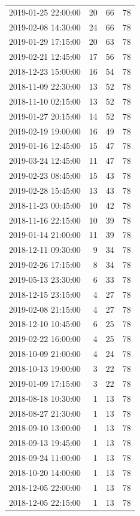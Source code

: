 \begin{tabular}{lrrr}
2019-01-25 22:00:00 & 20 & 66 & 78 \\
2019-02-08 14:30:00 & 24 & 66 & 78 \\
2019-01-29 17:15:00 & 20 & 63 & 78 \\
2019-02-21 12:45:00 & 17 & 56 & 78 \\
2018-12-23 15:00:00 & 16 & 54 & 78 \\
2018-11-09 22:30:00 & 13 & 52 & 78 \\
2018-11-10 02:15:00 & 13 & 52 & 78 \\
2019-01-27 20:15:00 & 14 & 52 & 78 \\
2019-02-19 19:00:00 & 16 & 49 & 78 \\
2019-01-16 12:45:00 & 15 & 47 & 78 \\
2019-03-24 12:45:00 & 11 & 47 & 78 \\
2019-02-23 08:45:00 & 15 & 43 & 78 \\
2019-02-28 15:45:00 & 13 & 43 & 78 \\
2018-11-23 00:45:00 & 10 & 42 & 78 \\
2018-11-16 22:15:00 & 10 & 39 & 78 \\
2019-01-14 21:00:00 & 11 & 39 & 78 \\
2018-12-11 09:30:00 & 9 & 34 & 78 \\
2019-02-26 17:15:00 & 8 & 34 & 78 \\
2019-05-13 23:30:00 & 6 & 33 & 78 \\
2018-12-15 23:15:00 & 4 & 27 & 78 \\
2019-02-08 21:15:00 & 4 & 27 & 78 \\
2018-12-10 10:45:00 & 6 & 25 & 78 \\
2019-02-22 16:00:00 & 4 & 25 & 78 \\
2018-10-09 21:00:00 & 4 & 24 & 78 \\
2018-10-13 19:00:00 & 3 & 22 & 78 \\
2019-01-09 17:15:00 & 3 & 22 & 78 \\
2018-08-18 10:30:00 & 1 & 13 & 78 \\
2018-08-27 21:30:00 & 1 & 13 & 78 \\
2018-09-10 13:00:00 & 1 & 13 & 78 \\
2018-09-13 19:45:00 & 1 & 13 & 78 \\
2018-09-24 11:00:00 & 1 & 13 & 78 \\
2018-10-20 14:00:00 & 1 & 13 & 78 \\
2018-12-05 22:00:00 & 1 & 13 & 78 \\
2018-12-05 22:15:00 & 1 & 13 & 78 \\

\end{tabular}
